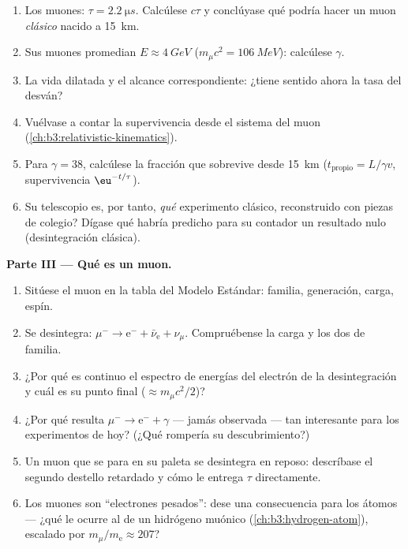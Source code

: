 \begin{problem}
\begin{enumerate}[resume]
  \item Los muones: $\tau = \qty{2.2}{\micro s}$. Calcúlese $c\tau$ y
        conclúyase qué podría hacer un muon \emph{clásico} nacido a
        \qty{15}{km}.
  \item Sus muones promedian $E \approx \qty{4}{GeV}$
        ($m_\mu c^2 = \qty{106}{MeV}$): calcúlese $\gamma$.
  \item La vida dilatada y el alcance correspondiente: ¿tiene sentido ahora
        la tasa del desván?
  \item Vuélvase a contar la supervivencia desde el sistema del muon
        (\cref{ch:b3:relativistic-kinematics}).
  \item Para $\gamma = 38$, calcúlese la fracción que sobrevive desde
        \qty{15}{km} ($t_{\text{propio}} = L/\gamma v$, supervivencia
        $\eu^{-t/\tau}$).
  \item Su telescopio es, por tanto, \emph{qué} experimento
        clásico, reconstruido con piezas de colegio? Dígase qué habría predicho
        para su contador un resultado nulo (desintegración clásica).
\end{enumerate}

\medskip\noindent\textbf{Parte III --- Qué es un muon.}

\begin{enumerate}[resume]
  \item Sitúese el muon en la tabla del Modelo Estándar: familia,
        generación, carga, espín.
  \item Se desintegra: $\mu^- \to \text{e}^- + \bar\nu_{\text{e}} +
        \nu_\mu$. Compruébense la carga y los dos  de familia.
  \item ¿Por qué es continuo el espectro de energías del electrón de la desintegración
        y cuál es su punto final ($\approx m_\mu c^2/2$)?
  \item ¿Por qué resulta $\mu^- \to \text{e}^- + \gamma$ --- jamás
        observada --- tan interesante para los experimentos de hoy?
        (¿Qué rompería su descubrimiento?)
  \item Un muon que se para en su paleta se desintegra en reposo: descríbase
        el segundo destello retardado y cómo le entrega $\tau$
        directamente.
  \item Los muones son ``electrones pesados'': dese una consecuencia para los
        átomos --- ¿qué le ocurre al  de un hidrógeno
        muónico (\cref{ch:b3:hydrogen-atom}), escalado por
        $m_\mu/m_{\text{e}} \approx 207$?
\end{enumerate}


\end{problem}
